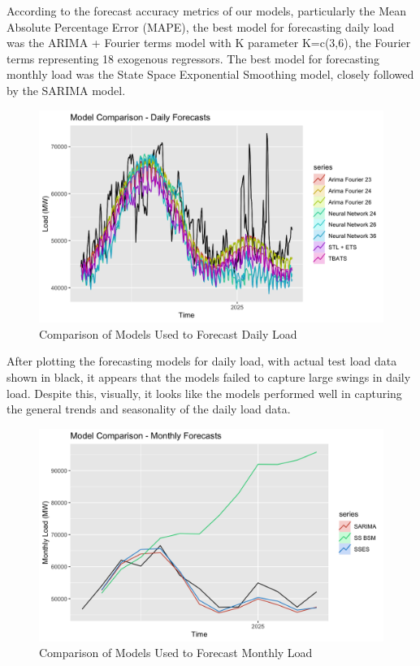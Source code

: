\documentclass[
]{article}
\begin{document}
According to the forecast accuracy metrics of our models, particularly
the Mean Absolute Percentage Error (MAPE), the best model for
forecasting daily load was the ARIMA + Fourier terms model with K
parameter K=c(3,6), the Fourier terms representing 18 exogenous
regressors. The best model for forecasting monthly load was the State
Space Exponential Smoothing model, closely followed by the SARIMA model.

\begin{figure}
\centering
\includegraphics{model_comparison_daily.png}
\caption{Comparison of Models Used to Forecast Daily Load}
\end{figure}

After plotting the forecasting models for daily load, with actual test
load data shown in black, it appears that the models failed to capture
large swings in daily load. Despite this, visually, it looks like the
models performed well in capturing the general trends and seasonality of
the daily load data.

\begin{figure}
\centering
\includegraphics{model_comparison_monthly.png}
\caption{Comparison of Models Used to Forecast Monthly Load}
\end{figure}
\end{document}
